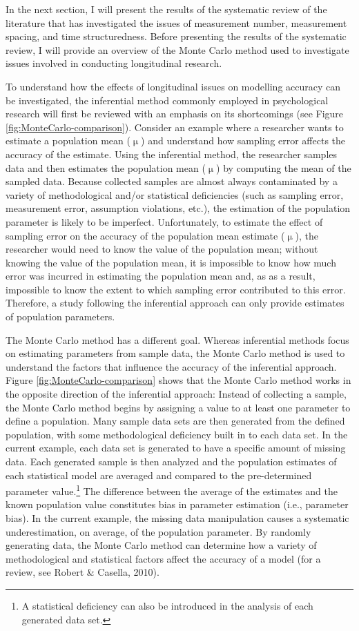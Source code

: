 \documentclass[
  english,
  man,floatsintext]{apa7}
\begin{document}
In the next section, I will present the results of the systematic review of the literature that has investigated the issues of measurement number, measurement spacing, and time structuredness. Before presenting the results of the systematic review, I will provide an overview of the Monte Carlo method used to investigate issues involved in conducting longitudinal research.

To understand how the effects of longitudinal issues on modelling accuracy can be investigated, the inferential method commonly employed in psychological research will first be reviewed with an emphasis on its shortcomings (see Figure \ref{fig:MonteCarlo-comparison}). Consider an example where a researcher wants to estimate a population mean (\(\upmu\)) and understand how sampling error affects the accuracy of the estimate. Using the inferential method, the researcher samples data and then estimates the population mean (\(\upmu\)) by computing the mean of the sampled data. Because collected samples are almost always contaminated by a variety of methodological and/or statistical deficiencies (such as sampling error, measurement error, assumption violations, etc.), the estimation of the population parameter is likely to be imperfect. Unfortunately, to estimate the effect of sampling error on the accuracy of the population mean estimate (\(\upmu\)), the researcher would need to know the value of the population mean; without knowing the value of the population mean, it is impossible to know how much error was incurred in estimating the population mean and, as as a result, impossible to know the extent to which sampling error contributed to this error. Therefore, a study following the inferential approach can only provide estimates of population parameters.

The Monte Carlo method has a different goal. Whereas inferential methods focus on estimating parameters from sample data, the Monte Carlo method is used to understand the factors that influence the accuracy of the inferential approach. Figure \ref{fig:MonteCarlo-comparison} shows that the Monte Carlo method works in the opposite direction of the inferential approach: Instead of collecting a sample, the Monte Carlo method begins by assigning a value to at least one parameter to define a population. Many sample data sets are then generated from the defined population, with some methodological deficiency built in to each data set. In the current example, each data set is generated to have a specific amount of missing data. Each generated sample is then analyzed and the population estimates of each statistical model are averaged and compared to the pre-determined parameter value.\footnote{A statistical deficiency can also be introduced in the analysis of each generated data set.} The difference between the average of the estimates and the known population value constitutes bias in parameter estimation (i.e., parameter bias). In the current example, the missing data manipulation causes a systematic underestimation, on average, of the population parameter. By randomly generating data, the Monte Carlo method can determine how a variety of methodological and statistical factors affect the accuracy of a model (for a review, see Robert \& Casella, 2010).
\end{document}
